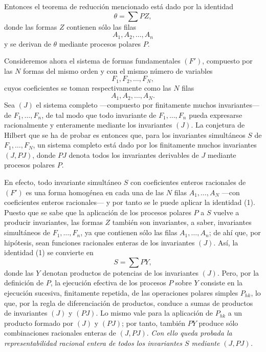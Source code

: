 \documentclass[11pt]{article}
\begin{document}
Entonces el teorema de reducción mencionado está dado por la identidad
\begin{equation}
  \theta=\sum PZ,
\tag{1}
\end{equation}
donde las formas $Z$ contienen sólo las filas
\[
  A_1,A_2,\ldots,A_n
\]
y se derivan de $\theta$ mediante procesos polares $P$.

Consideremos ahora el sistema de formas fundamentales $(F')$, compuesto por las $N$ formas del mismo orden y con el mismo número de variables
\[
  F_1,F_2,\ldots,F_N,
\]
cuyos coeficientes se toman respectivamente como las $N$ filas
\[
  A_1,A_2,\ldots,A_N.
\]
Sea $(J)$ el sistema completo ---compuesto por finitamente muchos invariantes--- de $F_1,
\ldots,F_n$, de tal modo que todo invariante de $F_1,
\ldots,F_n$ pueda expresarse racionalmente y enteramente mediante los invariantes $(J)$. La conjetura de Hilbert que se ha de probar es entonces que, para los invariantes simultáneos $S$ de $F_1,
\ldots,F_N$, un sistema completo está dado por los finitamente muchos invariantes $(J,PJ)$, donde $PJ$ denota todos los invariantes derivables de $J$ mediante procesos polares $P$.

En efecto, todo invariante simultáneo $S$ con coeficientes enteros racionales de $(F')$ es una forma homogénea en cada una de las $N$ filas $A_1,
\ldots,A_N$ ---con coeficientes enteros racionales--- y por tanto se le puede aplicar la identidad (1). Puesto que se sabe que la aplicación de los procesos polares $P$ a $S$ vuelve a producir invariantes, las formas $Z$ también son invariantes, a saber, invariantes simultáneos de $F_1,
\ldots,F_n$, ya que contienen sólo las filas $A_1,
\ldots,A_n$; de ahí que, por hipótesis, sean funciones racionales enteras de los invariantes $(J)$. Así, la identidad (1) se convierte en
\[
  S=\sum PY,
\]
donde las $Y$ denotan productos de potencias de los invariantes $(J)$. Pero, por la definición de $P$, la ejecución efectiva de los procesos $P$ sobre $Y$ consiste en la ejecución sucesiva, finitamente repetida, de las operaciones polares simples $P_{hk}$, lo que, por la regla de diferenciación de productos, conduce a sumas de productos de invariantes $(J)$ y $(PJ)$. Lo mismo vale para la aplicación de $P_{hk}$ a un producto formado por $(J)$ y $(PJ)$; por tanto, también $PY$ produce sólo combinaciones racionales enteras de $(J,PJ)$. \emph{Con ello queda probada la representabilidad racional entera de todos los invariantes $S$ mediante $(J,PJ)$.}
\end{document}
